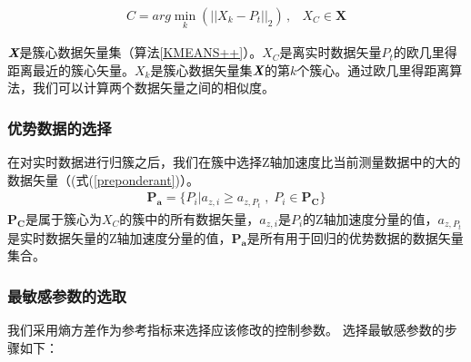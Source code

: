 \begin{eqnarray}\label{cluster}
C=arg\min \limits_{k}{(||X_{k}-P_{t}||_{2})} \, ,&X_{C}\in \bm{X}
\end{eqnarray}

$\textit{\textbf{X}}$是簇心数据矢量集（算法\ref{KMEANS++}）。$X_{C}$是离实时数据矢量$P_t$的欧几里得距离最近的簇心矢量。$X_{k}$是簇心数据矢量集$\textit{\textbf{X}}$的第$k$个簇心。通过欧几里得距离算法，我们可以计算两个数据矢量之间的相似度。

\subsubsection{优势数据的选择}
在对实时数据进行归簇之后，我们在簇中选择Z轴加速度比当前测量数据中的大的数据矢量（(式(\ref{preponderant})）。
\begin{eqnarray}\label{preponderant}
\bm{P_{a}}=\{P_{i} | a_{z,i}\geq a_{z,P_{t}} \; , \; P_{i}\in \bm{P_{C}}\}
\end{eqnarray}
$\bm{P_{C}}$是属于簇心为$X_{C}$的簇中的所有数据矢量，$a_{z,i}$是$P_{i}$的Z轴加速度分量的值，$a_{z,P_{t}}$是实时数据矢量的Z轴加速度分量的值，$\bm{P_{a}}$是所有用于回归的优势数据的数据矢量集合。

\subsubsection{最敏感参数的选取}
我们采用熵方差作为参考指标来选择应该修改的控制参数。 选择最敏感参数的步骤如下：

